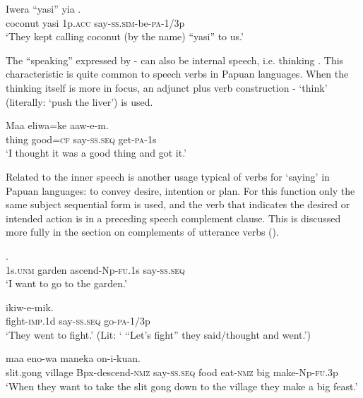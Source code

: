 \ea%
\label{ex:3:x326}
\gll Iwera ``yasi'' yia . \\
coconut yasi 1p.\textsc{acc} say-\textsc{ss}.\textsc{sim}-be-\textsc{pa}-1/3p\\
\glt`They kept calling coconut (by the name) ``yasi'' to us.' 
\z

The ``speaking'' expressed by - can also be internal speech, i.e. thinking . This characteristic is quite common to speech verbs in Papuan languages. When the thinking  itself is more in focus, an adjunct plus verb construction  - `think' (literally: `push the liver') is used.

\ea%
\label{ex:3:x327}
\gll Maa eliwa=ke  aaw-e-m. \\
thing good=\textsc{cf} say-\textsc{ss}.\textsc{seq} get-\textsc{pa}-1s \\
\glt`I thought it was a good thing and got it.'
\z

Related to the inner speech is another usage typical of verbs for `saying' in Papuan languages: to convey desire, intention or plan. For this function only the same subject sequential form\textit{}  is used, and the verb that indicates the desired or intended action is in a preceding speech complement clause. This is discussed more fully in the section on complements of utterance verbs (). 

\ea%
\label{ex:3:x328}
 . \\
1s.\textsc{unm} garden ascend-Np-\textsc{fu}.1s say-\textsc{ss}.\textsc{seq} \\
\glt`I want to go to the garden.'
\z

\ea%
\label{ex:3:x329}
\gll [Irak-u]  ikiw-e-mik. \\
fight-\textsc{imp}.1d say-\textsc{ss}.\textsc{seq} go-\textsc{pa}-1/3p\\
\glt`They went to fight.' (Lit: ` ``Let's fight'' they said/thought and went.')
\z

\ea%
\label{ex:3:x1608}
  maa eno-wa maneka on-i-kuan.\\
slit.gong village Bpx-descend-\textsc{nmz} say-\textsc{ss}.\textsc{seq} food eat-\textsc{nmz} big make-Np-\textsc{fu}.3p\\
\glt`When they want to take the slit gong down to the village they make a big feast.'
\z

